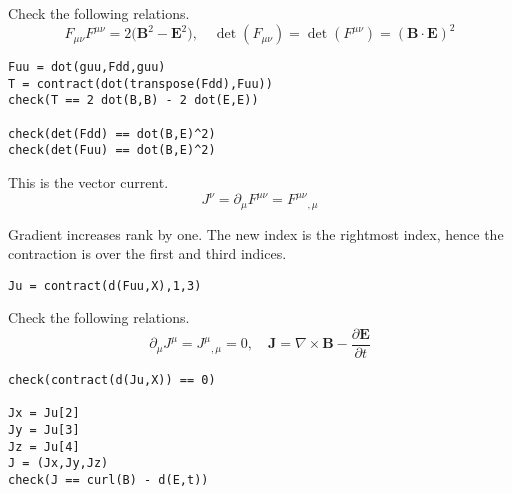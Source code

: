 Check the following relations.
\begin{equation*}
F_{\mu\nu}F^{\mu\nu}=2\bigl(\mathbf B^2-\mathbf E^2\bigl),\quad
\det(F_{\mu\nu})=\det(F^{\mu\nu})=(\mathbf B\cdot\mathbf E)^2
\end{equation*}
{\footnotesize\begin{verbatim}
Fuu = dot(guu,Fdd,guu)
T = contract(dot(transpose(Fdd),Fuu))
check(T == 2 dot(B,B) - 2 dot(E,E))

check(det(Fdd) == dot(B,E)^2)
check(det(Fuu) == dot(B,E)^2)
\end{verbatim}}%

This is the vector current.
\begin{equation*}
J^\nu
=\partial_\mu F^{\mu\nu}
=F^{\mu\nu}{}_{,\mu}
\end{equation*}

Gradient increases rank by one.
The new index is the rightmost index,
hence the contraction is over the first and third indices.
{\footnotesize\begin{verbatim}
Ju = contract(d(Fuu,X),1,3)
\end{verbatim}}%

Check the following relations.
\begin{equation*}
\partial_\mu J^\mu=J^\mu{}_{,\mu}=0,
\quad\mathbf J=\nabla\times\mathbf B-\frac{\partial\mathbf E}{\partial t}
\end{equation*}
{\footnotesize\begin{verbatim}
check(contract(d(Ju,X)) == 0)

Jx = Ju[2]
Jy = Ju[3]
Jz = Ju[4]
J = (Jx,Jy,Jz)
check(J == curl(B) - d(E,t))
\end{verbatim}}%


